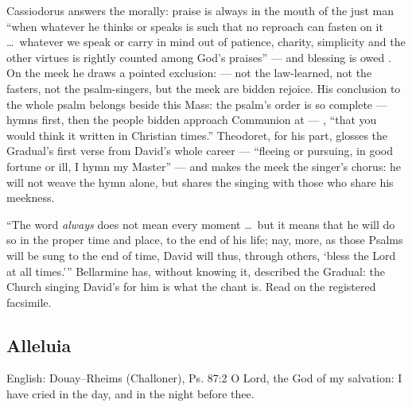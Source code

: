 \begin{witnessnote}
Cassiodorus answers the  morally: praise is always in
the mouth of the just man ``when whatever he thinks or speaks is such that no
reproach can fasten on it \dots\ whatever we speak or carry in mind out of
patience, charity, simplicity and the other virtues is rightly counted among
God's praises'' --- and blessing is owed . On the meek he draws a pointed exclusion:
--- not the law-learned, not the fasters, not the psalm-singers, but the
meek are bidden rejoice. His conclusion to the whole psalm belongs beside
this Mass: the psalm's order is so complete --- hymns first, then the
people bidden approach Communion at  --- , ``that you would think it
written in Christian times.'' Theodoret, for his part, glosses the Gradual's
first verse from David's whole career --- ``fleeing or pursuing, in good
fortune or ill, I hymn my Master'' --- and makes the meek the singer's chorus:
he will not weave the hymn alone, but shares the singing with those who share
his meekness.
\end{witnessnote}

\begin{witnessnote}
``The word \textit{always} does not mean every moment \dots\ but it means
that he will do so in the proper time and place, to the end of his life;
nay, more, as those Psalms will be sung to the end of time, David will thus,
through others, `bless the Lord at all times.'\thinspace'' Bellarmine has,
without knowing it, described the Gradual: the Church singing David's
 for him is what the chant is. Read on the registered facsimile.
\end{witnessnote}

\elementguard
\subsection*{Alleluia }


\begin{namedtranslation}{English: Douay--Rheims (Challoner), Ps. 87:2}
O Lord, the God of my salvation: I have cried in the day, and in the night
before thee.
\end{namedtranslation}

